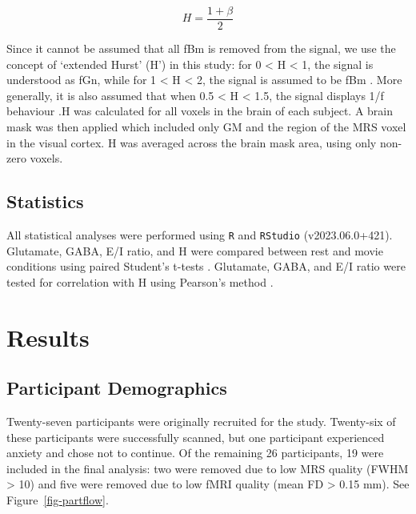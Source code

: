 \documentclass[
true
]{sn-jnl}
\begin{document}
\[
H = \frac{1 + \beta}{2}
\]

Since it cannot be assumed that all fBm is removed from the signal, we
use the concept of `extended Hurst' (H') in this study: for 0
\textless{} H \textless{} 1, the signal is understood as fGn, while for
1 \textless{} H \textless{} 2, the signal is assumed to be fBm
\citep{campbellFractalBasedAnalysisFMRI2022}. More generally, it is also
assumed that when 0.5 \textless{} H \textless{} 1.5, the signal displays
1/f behaviour \citep{zimmernWhyBrainCriticality2020}.H was calculated
for all voxels in the brain of each subject. A brain mask was then
applied which included only GM and the region of the MRS voxel in the
visual cortex. H was averaged across the brain mask area, using only
non-zero voxels.

\subsection{Statistics}\label{statistics}

All statistical analyses were performed using \texttt{R}
\citep{rcoreteamLanguageEnvironmentStatistical2021} and \texttt{RStudio}
(v2023.06.0+421). Glutamate, GABA, E/I ratio, and H were compared
between rest and movie conditions using paired Student's t-tests
\citep{studentProbableErrorMean1908}. Glutamate, GABA, and E/I ratio
were tested for correlation with H using Pearson's method
\citep{freedmanStatistics2007}.

\section{Results}\label{results}

\subsection{Participant Demographics}\label{participant-demographics}

Twenty-seven participants were originally recruited for the study.
Twenty-six of these participants were successfully scanned, but one
participant experienced anxiety and chose not to continue. Of the
remaining 26 participants, 19 were included in the final analysis: two
were removed due to low MRS quality (FWHM \textgreater{} 10) and five
were removed due to low fMRI quality (mean FD \textgreater{} 0.15 mm).
See Figure~\ref{fig-partflow}.
\end{document}
